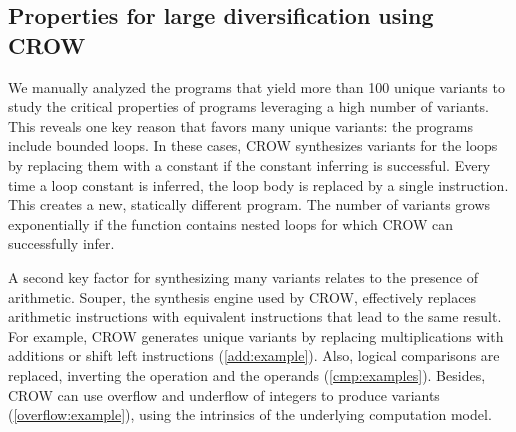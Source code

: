 \subsection{Properties for large diversification using CROW}

We manually analyzed the programs that yield more than 100 unique variants to study the critical properties of programs leveraging a high number of variants.
This reveals one key reason that favors many unique variants: the programs include bounded loops. In these cases, CROW synthesizes variants for the loops by replacing them with a constant if the constant inferring is successful. Every time a loop constant is inferred, the loop body is replaced by a single instruction. This creates a new, statically different program. The number of variants grows exponentially if the function contains nested loops for which CROW can successfully infer. 

A second key factor for synthesizing many variants relates to the presence of arithmetic. Souper, the synthesis engine used by CROW, effectively replaces arithmetic instructions with equivalent instructions that lead to the same result. For example, CROW generates unique variants by replacing multiplications with additions or shift left instructions (\autoref{add:example}). Also, logical comparisons are replaced, inverting the operation and the operands (\autoref{cmp:examples}). Besides, CROW can use overflow and underflow of integers to produce variants (\autoref{overflow:example}), using the intrinsics of the underlying computation model.

